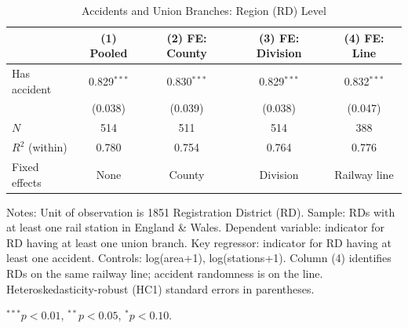 \documentclass[11pt]{article}
\begin{document}
\begin{table}[htbp]
\centering
\begin{threeparttable}
\caption{Accidents and Union Branches: Region (RD) Level}
\label{tab:rd_level}
\begin{tabular}{lcccc}
\toprule
 & (1) Pooled & (2) FE: County & (3) FE: Division & (4) FE: Line \\
\midrule
Has accident & 0.829$^{***}$ & 0.830$^{***}$ & 0.829$^{***}$ & 0.832$^{***}$ \\
 & (0.038) & (0.039) & (0.038) & (0.047) \\
\midrule
\(N\) & 514 & 511 & 514 & 388 \\
\(R^2\) (within) & 0.780 & 0.754 & 0.764 & 0.776 \\
\midrule
Fixed effects & None & County & Division & Railway line \\
\bottomrule
\end{tabular}
\begin{tablenotes}
\small
\item Notes: Unit of observation is 1851 Registration District (RD). Sample: RDs with at least one rail station in England \& Wales. Dependent variable: indicator for RD having at least one union branch. Key regressor: indicator for RD having at least one accident. Controls: log(area+1), log(stations+1). Column (4) identifies RDs on the same railway line; accident randomness is on the line. Heteroskedasticity-robust (HC1) standard errors in parentheses.
\item $^{***}p<0.01$, $^{**}p<0.05$, $^{*}p<0.10$.
\end{tablenotes}
\end{threeparttable}
\end{table}
\end{document}
